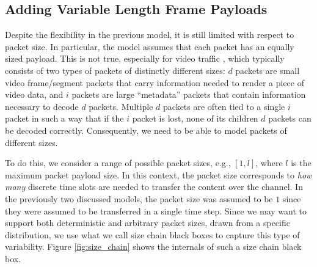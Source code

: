 \documentclass[conference]{IEEEtran}
\begin{document}
\subsection{Adding Variable Length Frame Payloads}
Despite the flexibility in the previous model, it is still limited with respect to packet size. In particular, the model assumes that each packet has an equally sized payload. This is not true, especially for video traffic \cite{badia2010markov}, which typically consists of two types of packets of distinctly different sizes: $d$ packets are small video frame/segment packets that carry information needed to render a piece of video data, and $i$ packets are large ``metadata'' packets that contain information necessary to decode $d$ packets. Multiple $d$ packets are often tied to a single $i$ packet in such a way that if the $i$ packet is lost, none of its children $d$ packets can be decoded correctly. Consequently, we need to be able to model packets of different sizes. 

To do this, we consider a range of possible packet sizes, e.g., $[1,l]$, where $l$ is the maximum packet payload size. In this context, the packet size corresponds to \emph{how many} discrete time slots are needed to transfer the content over the channel. In the previously two discussed models, the packet size was assumed to be $1$ since they were assumed to be transferred in a single time step. Since we may want to support both deterministic and arbitrary packet sizes, drawn from a specific distribution, we use what we call size chain black boxes to capture this type of variability. Figure \ref{fig:size_chain} shows the internals of such a size chain black box.
\end{document}
